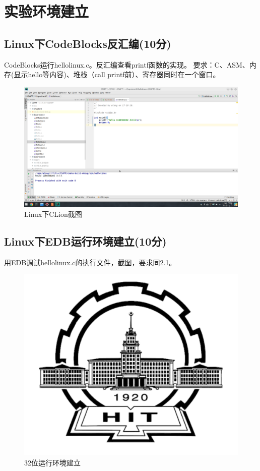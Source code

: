 \section{实验环境建立}
\subsection{Linux下CodeBlocks反汇编(10分)}
CodeBlocks运行hellolinux.c。反汇编查看printf函数的实现。
要求：C、ASM、内存(显示hello等内容)、堆栈（call printf前）、寄存器同时在一个窗口。

\begin{figure}[H]
	\centering
	\includegraphics[width=0.55\linewidth]{figures/Linux-Clion}
	\caption{Linux下CLion截图}
	\label{fig:linux-clion}
\end{figure}

\subsection{Linux下EDB运行环境建立(10分)}

用EDB调试hellolinux.c的执行文件，截图，要求同2.1。

\begin{figure}[H]
	\centering
	\includegraphics[width=0.5\linewidth]{figures/HIT}
	\caption{32位运行环境建立}
	\label{Linux下EDB截图}
\end{figure}

